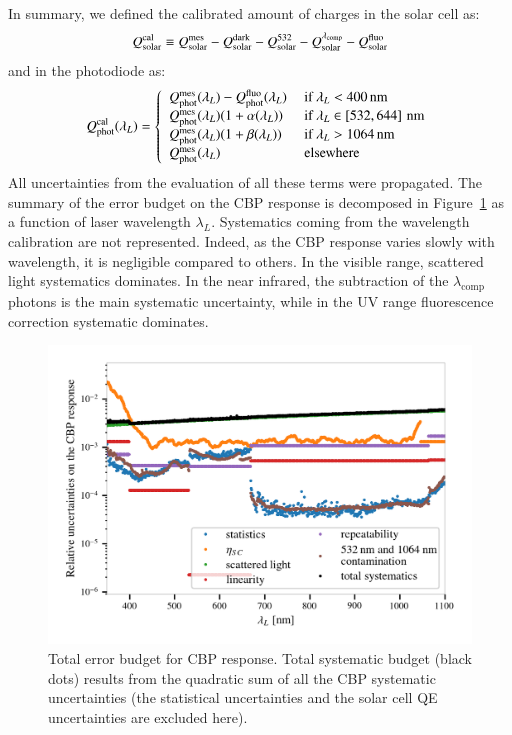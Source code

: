 In summary, we defined the calibrated amount of charges in the solar cell as:
\begin{equation}
Q_{\mathrm{solar}}^{\mathrm{cal}} \equiv Q_{\mathrm{solar}}^{\mathrm{mes}} - Q_{\mathrm{solar}}^{\rm dark} - Q_{\mathrm{solar}}^{532} - Q_{\mathrm{solar}}^{\lambda_{\rm comp}} - Q_{\mathrm{solar}}^{\rm fluo}
\end{equation}
and in the photodiode as:
\begin{equation}
\Qphotcal(\lambda_L) = \left\lbrace
\begin{array}{ll}
          \Qphotmes(\lambda_L) - \Qphot^{\mathrm{fluo}}(\lambda_L) &\ \text{if}\ \lambda_L < \SI{400}{\nano\meter} \\
         \Qphotmes(\lambda_L)(1 + \alpha(\lambda_L)) &\ \text{if}\ \lambda_L \in \left[532, 644\right]\mathrm{\,nm} \\
        \Qphotmes(\lambda_L)(1 + \beta(\lambda_L)) &\ \text{if}\ \lambda_L > \SI{1064}{\nano\meter} \\
        \Qphotmes(\lambda_L)&\ \text{elsewhere}
\end{array}\right. 
\end{equation}
All uncertainties from the evaluation of all these terms were propagated. The summary of the error budget on the CBP response is decomposed in Figure~\ref{fig:cbp_budget} as a function of laser wavelength $\lambda_L$. Systematics coming from the wavelength calibration are not represented. Indeed, as the CBP response varies slowly with wavelength, it is negligible compared to others.  In the visible range, scattered light systematics dominates. In the near infrared, the subtraction of the $\lambda_{\mathrm{comp}}$ photons is the main systematic uncertainty, while in the UV range fluorescence correction systematic dominates.

\begin{figure}[h]
    \centering
    \includegraphics[width=\columnwidth]{fig/cbp_error_budget.png}
    \caption{Total error budget for CBP response. Total systematic budget (black dots) results from the quadratic sum of all the CBP systematic uncertainties (the statistical uncertainties and the solar cell QE uncertainties are excluded here).}
    \label{fig:cbp_budget}
\end{figure}

